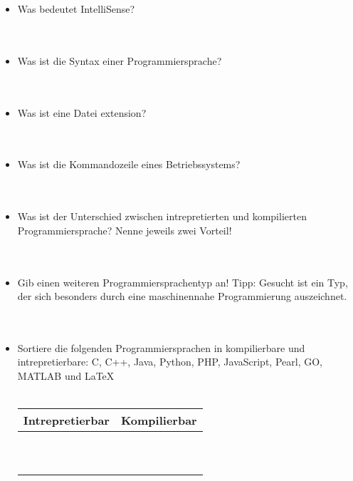 \begin{itemize}
	\item{Was bedeutet IntelliSense?}
	\\
	\\
	\\
	\item{Was ist die Syntax einer Programmiersprache?}
	\\
	\\
	\\
	\item{Was ist eine Datei extension?}
	\\
	\\
	\\
	\item{Was ist die Kommandozeile eines Betriebssystems?}
	\\
	\\
	\\
	\item{Was ist der Unterschied zwischen intrepretierten und  kompilierten Programmiersprache? Nenne jeweils zwei Vorteil!}
	\\
	\\
	\\
	\item{Gib einen weiteren Programmiersprachentyp an! Tipp: Gesucht ist ein Typ, der sich besonders durch eine maschinennahe Programmierung auszeichnet.}
	\\
	\\
	\\
	\item{Sortiere die folgenden Programmiersprachen in kompilierbare und intrepretierbare: C, C++, Java, Python, PHP, JavaScript, Pearl, GO, MATLAB und LaTeX}
	\\
	\\
	\begin{tabular}{ l | l }
		\hline Intrepretierbar & Kompilierbar\\
		\hline \\
		 & \\
		 & \\
		 & \\
		 & \\
		 & \\
		 & \\
		 & \\
		 & \\ 
		 & \\
	\end{tabular}
\end{itemize}
